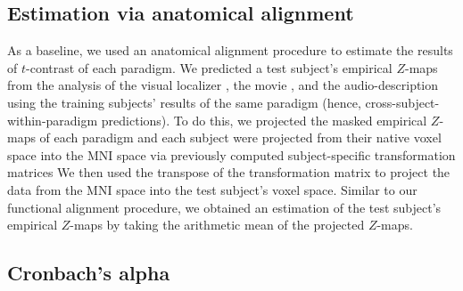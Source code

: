 \subsection{Estimation via anatomical alignment}



%
As a baseline, we used an anatomical alignment procedure to estimate the results
of $t$-contrast of each paradigm.
%
We predicted a test subject's empirical $Z$-maps from the analysis of
%
the visual localizer \citep{sengupta2016extension},
%
the movie \citep{haeusler2022processing}, and
%
the audio-description \citep{haeusler2022processing}
%
using the training subjects' results of the same paradigm (hence,
cross-subject-within-paradigm predictions).
%
To do this, we projected the masked empirical $Z$-maps of each paradigm and each
subject were projected from their native voxel space into the MNI space via
previously computed subject-specific transformation matrices
\citep[][\href{https://github.com/psychoinformatics-de/studyforrest-data-templatetransforms}{\url{github.com/psychoinformatics-de/studyforrest-data-templatetransforms}}]{hanke2014audiomovie}
We then used the transpose of the transformation matrix to project the data from
the MNI space into the test subject's voxel space.
Similar to our functional alignment procedure, we obtained an estimation of the
test subject's empirical $Z$-maps by taking the arithmetic mean of the projected
$Z$-maps.



\subsection{Cronbach's alpha}





